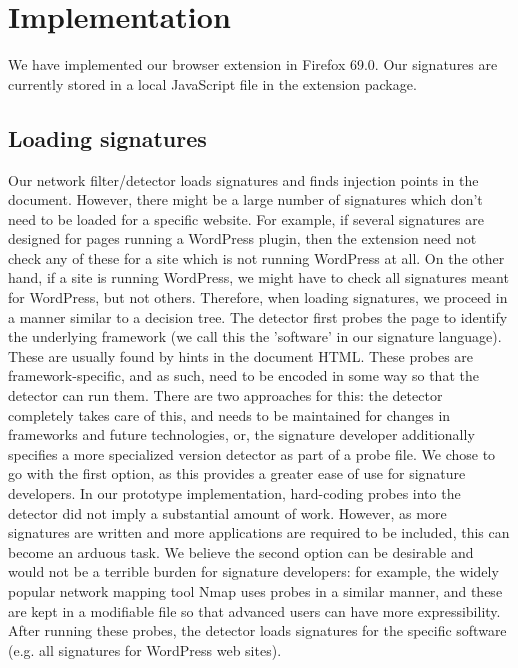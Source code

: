 \section{Implementation} \label{implementation}

We have implemented our browser extension in Firefox 69.0. Our signatures are currently stored in a local JavaScript file in the extension package.

\subsection{Loading signatures}
Our network filter/detector loads signatures and finds injection points in the document. However, there might be a large number of signatures which don't need to be loaded for a specific website. For example, if several signatures are designed for pages running a WordPress plugin, then the extension need not check any of these for a site which is not running WordPress at all. On the other hand, if a site is running WordPress, we might have to check all signatures meant for WordPress, but not others. Therefore, when loading signatures, we proceed in a manner similar to a decision tree. The detector first probes the page to identify the underlying framework (we call this the 'software' in our signature language). These are usually found by hints in the document HTML. These probes are framework-specific, and as such, need to be encoded in some way so that the detector can run them. There are two approaches for this: the detector completely takes care of this, and needs to be maintained for changes in frameworks and future technologies, or, the signature developer additionally specifies a more specialized version detector as part of a probe file. We chose to go with the first option, as this provides a greater ease of use for signature developers. In our prototype implementation, hard-coding probes into the detector did not imply a substantial amount of work. However, as more signatures are written and more applications are required to be included, this can become an arduous task. We believe the second option can be desirable and would not be a terrible burden for signature developers: for example, the widely popular network mapping tool Nmap \cite{nMap} uses probes in a similar manner, and these are kept in a modifiable file so that advanced users can have more expressibility. After running these probes, the detector loads signatures for the specific software (e.g. all signatures for WordPress web sites).  

